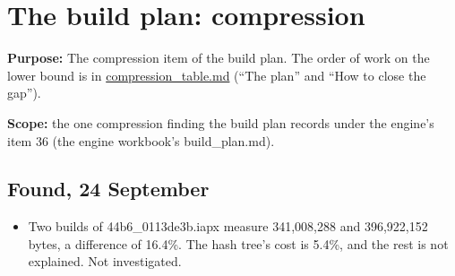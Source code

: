\chapter{\texorpdfstring{The build plan: compression}{The build plan: compression}}
\label{chap:build-plan}

\textbf{Purpose:} The compression item of the build plan. The order of work on the lower bound is in \hyperref[chap:compression-table]{compression\_\allowbreak{}table.md} (“The plan” and “How to close the gap”).

\textbf{Scope:} the one compression finding the build plan records under the engine's item 36 (the engine workbook's build\_\allowbreak{}plan.md).

\section{\texorpdfstring{Found, 24 September}{Found, 24 September}}

\begin{itemize}
\item Two builds of 44b6\_\allowbreak{}0113de3b.iapx measure 341,008,288 and 396,922,152 bytes, a difference of 16.4\%. The hash tree's cost is 5.4\%, and the rest is not explained. Not investigated.
\end{itemize}
